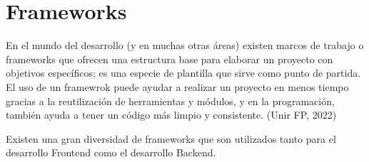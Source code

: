 \section{Frameworks}
En el mundo del desarrollo (y en muchas otras áreas) existen marcos de trabajo o frameworks que ofrecen una estructura base para elaborar un proyecto con objetivos específicos; es una especie de plantilla que sirve como punto de partida. El uso de un framewrok puede ayudar a realizar un proyecto en menos tiempo gracias a la reutilización de herramientas y módulos, y en la programación, también ayuda a tener un código más limpio y consistente. (Unir FP, 2022)

Existen una gran diversidad de frameworks que son utilizados tanto para el desarrollo Frontend como el desarrollo Backend. 
    
    